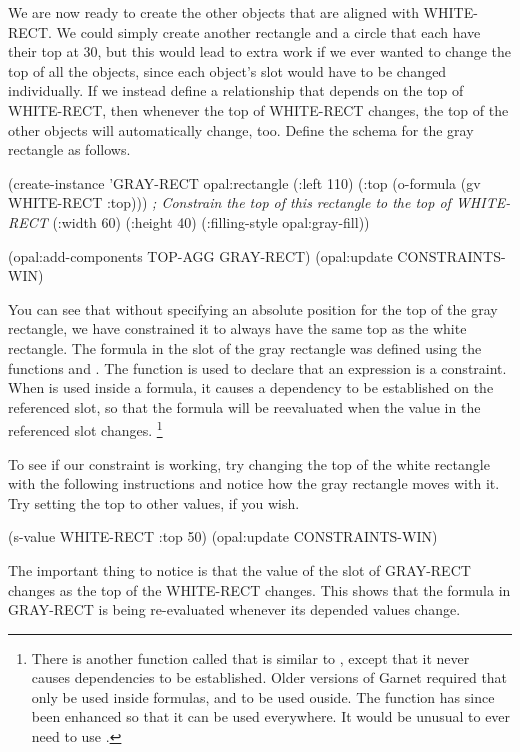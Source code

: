 We are now ready to create the other objects that are aligned with
WHITE-RECT.  We could simply create another rectangle and a circle that
each have their top at 30, but this would lead to extra work if we ever
wanted to change the top of all the objects, since each object's
 slot would have to be changed individually.  If we instead
define a relationship that depends on the top of WHITE-RECT, then
whenever the top of WHITE-RECT changes, the top of the other objects
will automatically change, too.  Define the schema for the gray
rectangle as follows.

\begin{programexample}
(create-instance 'GRAY-RECT opal:rectangle
   (:left 110)
   (:top (o-formula (gv WHITE-RECT :top)))  {\it ; Constrain the top of this rectangle to the top of WHITE-RECT}
   (:width 60) (:height 40)
   (:filling-style opal:gray-fill))

(opal:add-components TOP-AGG GRAY-RECT)
(opal:update CONSTRAINTS-WIN)
\end{programexample}

You can see that without specifying an absolute position for the top
of the gray rectangle, we have constrained it to always have the same
top as the white rectangle.  The formula in the  slot of
the gray rectangle was defined using the functions  and
.  The  function is used to declare that an
expression is a constraint.  When  is used inside a formula,
it causes a dependency to be established on the referenced slot, so that
the formula will be reevaluated when the value in the referenced slot
changes.  \footnote{There is another function called 
that is similar
to , except that it never causes dependencies to be established.
Older versions of Garnet required that  only be used inside
formulas, and  to be used ouside.  The  function has
since been enhanced so that it can be used everywhere.  It would be
unusual to ever need to use .}

To see if our constraint is working, try changing the
top of the white rectangle with the following instructions and notice
how the gray rectangle moves with it.  Try setting the top to other
values, if you wish.

\begin{programexample}
(s-value WHITE-RECT :top 50)
(opal:update CONSTRAINTS-WIN)
\end{programexample}

The important thing to notice is that the value of the  slot
of GRAY-RECT changes as the top of the WHITE-RECT changes.  This shows
that the formula in GRAY-RECT is being re-evaluated whenever its
depended values change.

